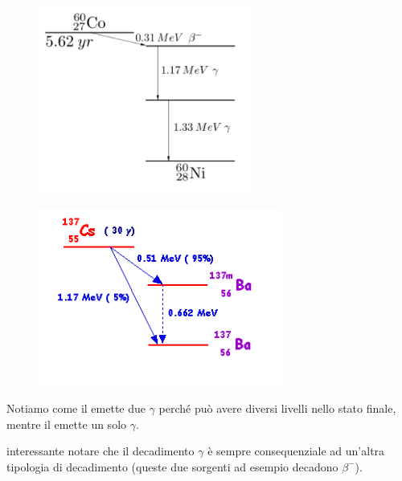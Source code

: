 \vspace{-0.4cm}\begin{minipage}{0.5\textwidth}
    \begin{figure}[H]
        \centering
        \includegraphics[width=7cm]{immagini/spettro_decadimento_gamma_1.png}
    \end{figure}
\end{minipage}
\begin{minipage}{0.5\textwidth}
    \begin{figure}[H]
        \centering
        \includegraphics[width=8cm]{immagini/spettro_decadimento_gamma_2.png}
    \end{figure}
\end{minipage}

Notiamo come il  emette due $\gamma$ perché può avere diversi livelli nello stato finale, mentre il  emette un solo $\gamma$.

\E interessante notare che il decadimento $\gamma$ è sempre consequenziale ad un'altra tipologia di decadimento (queste due sorgenti ad esempio decadono $\beta^-$).

\vspace{-0.2cm}

